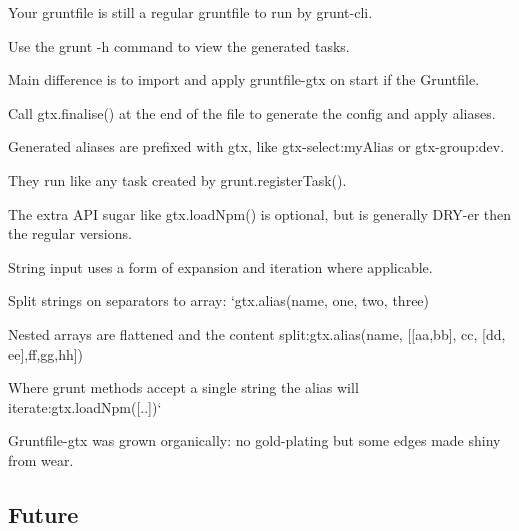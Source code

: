\begin{DoxyItemize}
\item Your gruntfile is still a regular gruntfile to run by {\ttfamily grunt-\/cli}.
\begin{DoxyItemize}
\item Use the {\ttfamily grunt -\/h} command to view the generated tasks.
\item Main difference is to import and apply {\ttfamily gruntfile-\/gtx} on start if the Gruntfile.
\item Call {\ttfamily gtx.\+finalise()} at the end of the file to generate the config and apply aliases.
\end{DoxyItemize}
\item Generated aliases are prefixed with {\ttfamily gtx}, like {\ttfamily gtx-\/select\+:my\+Alias} or {\ttfamily gtx-\/group\+:dev}.
\begin{DoxyItemize}
\item They run like any task created by {\ttfamily grunt.\+register\+Task()}.
\end{DoxyItemize}
\item The extra A\+PI sugar like {\ttfamily gtx.\+load\+Npm()} is optional, but is generally D\+R\+Y-\/er then the regular versions.
\item String input uses a form of expansion and iteration where applicable.
\begin{DoxyItemize}
\item Split strings on separators to array\+: `gtx.alias(\textquotesingle{}name\textquotesingle{}, \textquotesingle{}one, two, three\textquotesingle{}){\ttfamily }
\item {\ttfamily  Nested arrays are flattened and the content split\+:}gtx.\+alias(\textquotesingle{}name\textquotesingle{}, \mbox{[}\mbox{[}\textquotesingle{}aa\textquotesingle{},\textquotesingle{}bb\textquotesingle{}\mbox{]}, \textquotesingle{}cc\textquotesingle{}, \mbox{[}\textquotesingle{}dd, ee\textquotesingle{}\mbox{]},\textquotesingle{}ff,gg,hh\textquotesingle{}\mbox{]}){\ttfamily }
\item {\ttfamily  Where grunt methods accept a single string the alias will iterate\+:}gtx.\+load\+Npm(\mbox{[}..\mbox{]})`
\end{DoxyItemize}
\item Gruntfile-\/gtx was grown organically\+: no gold-\/plating but some edges made shiny from wear.
\end{DoxyItemize}

\subsection*{Future}

